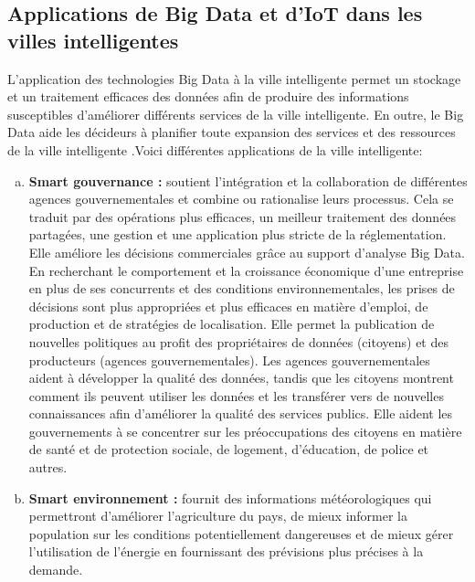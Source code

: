 \documentclass[french, a4paper, 12pt]{report}
\begin{document}
\subsection{Applications de Big Data et d'IoT dans les villes intelligentes}
L'application des technologies Big Data à la ville intelligente permet un stockage et un traitement efficaces des données afin de produire des informations susceptibles d'améliorer différents services de la ville intelligente. En outre, le Big Data aide les décideurs à planifier toute expansion des services et des ressources de la ville intelligente \cite{9}.Voici différentes applications de la ville intelligente:

\begin{enumerate}[a.] 
\item \textbf{Smart gouvernance :} soutient l'intégration et la collaboration de différentes agences gouvernementales et combine ou rationalise leurs processus. Cela se traduit par des opérations plus efficaces, un meilleur traitement des données partagées, une gestion et une application plus stricte de la réglementation.
Elle améliore les décisions commerciales grâce au support d'analyse Big Data. En recherchant le comportement et la croissance économique d’une entreprise en plus de ses concurrents et des conditions environnementales, les prises de décisions sont plus appropriées et plus efficaces en matière d’emploi, de production et de stratégies de localisation.
Elle permet la publication de nouvelles politiques au profit des propriétaires de données (citoyens) et des producteurs (agences gouvernementales). Les agences gouvernementales aident à développer la qualité des données, tandis que les citoyens montrent comment ils peuvent utiliser les données et les transférer vers de nouvelles connaissances afin d'améliorer la qualité des services publics.
Elle aident les gouvernements à se concentrer sur les préoccupations des citoyens en matière de santé et de protection sociale, de logement, d’éducation, de police et autres.\\

\item \textbf{Smart environnement :} fournit des informations météorologiques qui permettront d’améliorer l’agriculture du pays, de mieux informer la population sur les conditions potentiellement dangereuses et de mieux gérer l’utilisation de l’énergie en fournissant des prévisions plus précises à la demande.\\


\end{enumerate}
\end{document}
